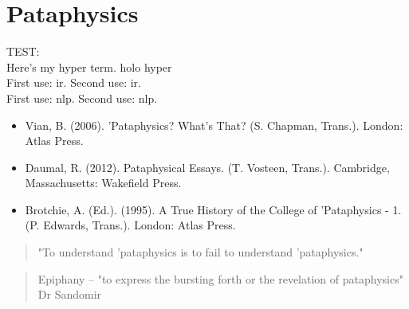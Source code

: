 
\pagestyle{fancy}

\chapter{Pataphysics}

TEST:\\
Here’s my \gls{hyper} term. \gls{holo} \gls{hyper}\\
First use: \gls{ir}. Second use: \gls{ir}.\\
First use: \gls{nlp}. Second use: \gls{nlp}.

\begin{itemize}
  \item Vian, B. (2006). 'Pataphysics? What's That? (S. Chapman, Trans.). London: Atlas Press.\citep{Vian2006}\\
  \item Daumal, R. (2012). Pataphysical Essays. (T. Vosteen, Trans.). Cambridge, Massachusetts: Wakefield Press.\citep{Daumal2012}\\
  \item Brotchie, A. (Ed.). (1995). A True History of the College of  'Pataphysics - 1. (P. Edwards, Trans.). London: Atlas Press.\citep{Brotchie1995}
\end{itemize}

\begin{quote}
  "To understand 'pataphysics is to fail to understand 'pataphysics." \citep{Hugill2012a}
\end{quote}

\begin{quote}
  Epiphany – "to express the bursting forth or the revelation of pataphysics" Dr Sandomir \citep[p.174]{Hugill2012a}
\end{quote}

